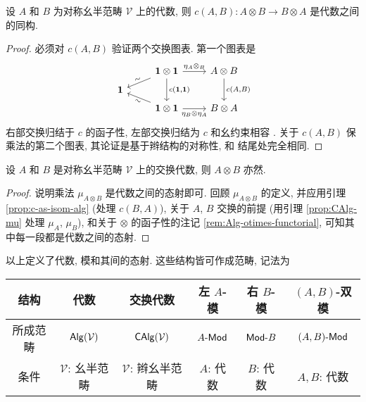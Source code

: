 \begin{lemma}\label{prop:c-as-isom-alg}
	设 $A$ 和 $B$ 为对称幺半范畴 $\mathcal{V}$ 上的代数, 则 $c(A, B): A \otimes B \to B \otimes A$ 是代数之间的同构.
\end{lemma}
\begin{proof}
	必须对 $c(A, B)$ 验证两个交换图表. 第一个图表是
	\[\begin{tikzcd}[row sep=tiny]
		& \munit \otimes \munit \arrow[ld, "\sim" sloped] \arrow[dd, "{c(\munit, \munit)}"] \arrow[r, "{\eta_A \otimes_B}"] & A \otimes B \arrow[dd, "{c(A, B)}"] \\
		\munit & & \\
		& \munit \otimes \munit \arrow[lu, "\sim"' sloped] \arrow[r, "{\eta_B \otimes \eta_A}"'] & B \otimes A
	\end{tikzcd}\]
	右部交换归结于 $c$ 的函子性, 左部交换归结为 $c$ 和幺约束相容 \cite[(3.12)]{Li1}. 关于 $c(A, B)$ 保乘法的第二个图表, 其论证是基于辫结构的对称性, 和 \cite[\S 7.4]{Li1} 结尾处完全相同.
\end{proof}

\begin{proposition}
	设 $A$ 和 $B$ 是对称幺半范畴 $\mathcal{V}$ 上的交换代数, 则 $A \otimes B$ 亦然.
\end{proposition}
\begin{proof}
	说明乘法 $\mu_{A \otimes B}$ 是代数之间的态射即可. 回顾 $\mu_{A \otimes B}$ 的定义, 并应用引理 \ref{prop:c-as-isom-alg} (处理 $c(B, A)$), 关于 $A$, $B$ 交换的前提 (用引理 \ref{prop:CAlg-mu} 处理 $\mu_A$, $\mu_B$), 和关于 $\otimes$ 的函子性的注记 \ref{rem:Alg-otimes-functorial}, 可知其中每一段都是代数之间的态射.
\end{proof}

以上定义了代数, 模和其间的态射. 这些结构皆可作成范畴, 记法为
\begin{center}\begin{tabular}{|c|c|c|c|c|c|} \hline
	结构 & 代数 & 交换代数 & 左 $A$-模 & 右 $B$-模 & $(A,B)$-双模 \\ \hline
	所成范畴 & $\mathsf{Alg}(\mathcal{V})$ & $\mathsf{CAlg}(\mathcal{V})$ & $A\text{-}\mathsf{Mod}$ & $\mathsf{Mod}\text{-}B$ & $(A,B)\text{-}\mathsf{Mod}$ \\ \hline
	条件 & {\small $\mathcal{V}$: 幺半范畴} & {\small $\mathcal{V}$: 辫幺半范畴} & {\small $A$: 代数} & {\small $B$: 代数} & {\small $A, B$: 代数} \\ \hline
\end{tabular}\end{center}

